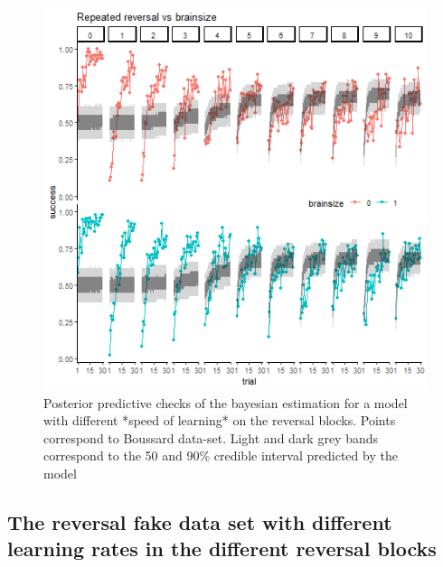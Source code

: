 \documentclass[
]{article}
\begin{document}
\begin{figure}

\includegraphics[width=6.67in,]{images/boussardREV_ppchecks} \hfill{}

\caption{Posterior predictive checks of the bayesian estimation for a model with different *speed of learning* on the reversal blocks. Points correspond to Boussard  data-set. Light and dark grey bands correspond to the 50 and 90\% credible interval predicted by the model}\label{fig:ppchecks_boussard_rev}
\end{figure}

\hypertarget{the-reversal-fake-data-set-with-different-learning-rates-in-the-different-reversal-blocks}{%
\subsection{The reversal fake data set with different learning rates in
the different reversal
blocks}\label{the-reversal-fake-data-set-with-different-learning-rates-in-the-different-reversal-blocks}}
\end{document}
